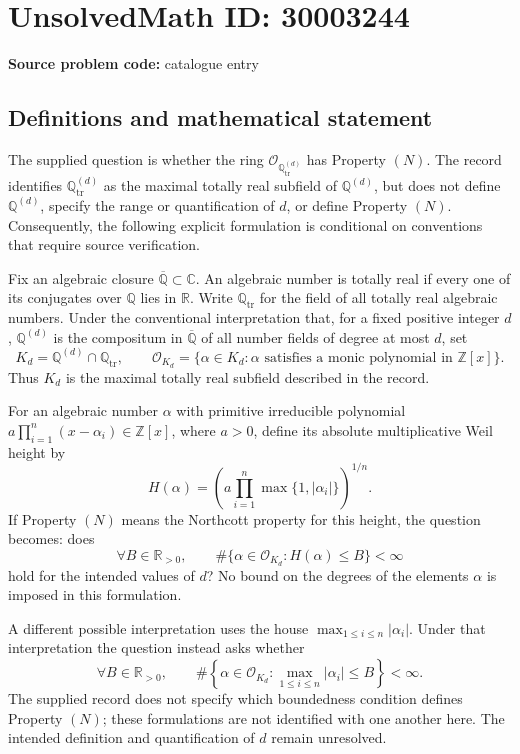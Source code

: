 \documentclass[11pt]{article}
\begin{document}
\section*{UnsolvedMath ID: 30003244}
\textbf{Source problem code:} catalogue entry
\subsection{Definitions and mathematical statement}
The supplied question is whether the ring \(\mathcal O_{\mathbb Q_{\mathrm{tr}}^{(d)}}\) has Property \((N)\). The record identifies \(\mathbb Q_{\mathrm{tr}}^{(d)}\) as the maximal totally real subfield of \(\mathbb Q^{(d)}\), but does not define \(\mathbb Q^{(d)}\), specify the range or quantification of \(d\), or define Property \((N)\). Consequently, the following explicit formulation is conditional on conventions that require source verification.

Fix an algebraic closure \(\overline{\mathbb Q}\subset\mathbb C\). An algebraic number is totally real if every one of its conjugates over \(\mathbb Q\) lies in \(\mathbb R\). Write \(\mathbb Q_{\mathrm{tr}}\) for the field of all totally real algebraic numbers. Under the conventional interpretation that, for a fixed positive integer \(d\), \(\mathbb Q^{(d)}\) is the compositum in \(\overline{\mathbb Q}\) of all number fields of degree at most \(d\), set
\[
K_d=\mathbb Q^{(d)}\cap\mathbb Q_{\mathrm{tr}},\qquad
\mathcal O_{K_d}=\{\alpha\in K_d:\alpha\text{ satisfies a monic polynomial in }\mathbb Z[x]\}.
\]
Thus \(K_d\) is the maximal totally real subfield described in the record.

For an algebraic number \(\alpha\) with primitive irreducible polynomial \(a\prod_{i=1}^{n}(x-\alpha_i)\in\mathbb Z[x]\), where \(a>0\), define its absolute multiplicative Weil height by
\[
H(\alpha)=\left(a\prod_{i=1}^{n}\max\{1,|\alpha_i|\}\right)^{1/n}.
\]
If Property \((N)\) means the Northcott property for this height, the question becomes: does
\[
\forall B\in\mathbb R_{>0},\qquad
\#\{\alpha\in\mathcal O_{K_d}:H(\alpha)\le B\}<\infty
\]
hold for the intended values of \(d\)? No bound on the degrees of the elements \(\alpha\) is imposed in this formulation.

A different possible interpretation uses the house \(\max_{1\le i\le n}|\alpha_i|\). Under that interpretation the question instead asks whether
\[
\forall B\in\mathbb R_{>0},\qquad
\#\left\{\alpha\in\mathcal O_{K_d}:\max_{1\le i\le n}|\alpha_i|\le B\right\}<\infty.
\]
The supplied record does not specify which boundedness condition defines Property \((N)\); these formulations are not identified with one another here. The intended definition and quantification of \(d\) remain unresolved.
\end{document}
